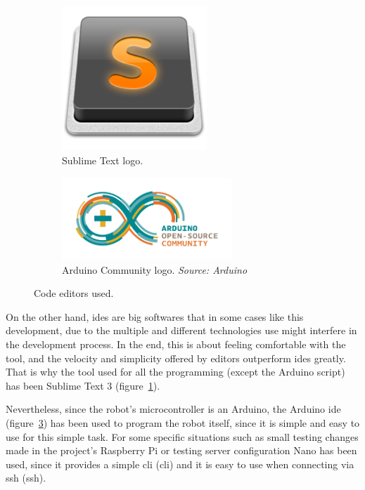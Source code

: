 \begin{figure}[!htbp]
	\centering
	\begin{subfigure}{0.35\textwidth}
		\centering
		\includegraphics[width=0.6\textwidth]{fig/sublime}
		\caption{Sublime Text logo.}\label{subfig:sublime}
	\end{subfigure}\quad
	\begin{subfigure}{0.55\textwidth}
		\centering
		\includegraphics[width=0.7\textwidth]{fig/arduino-community}
		\caption{Arduino Community logo. \emph{Source: Arduino}}\label{subfig:arduino_community}
	\end{subfigure}\quad
	\caption{Code editors used.}
\end{figure}

On the other hand, \acrshort{ide}s are big softwares that in some cases like this development, due
to the multiple and different technologies use might interfere in the development process. In the
end, this is about feeling comfortable with the tool, and the velocity and simplicity offered by
editors outperform \acrshort{ide}s greatly. That is why the tool used for all the programming
(except the Arduino script) has been Sublime Text 3 (figure~\ref{subfig:sublime}).

Nevertheless, since the robot's microcontroller is an Arduino, the Arduino
\acrshort{ide}~\cite{arduino_ide} (figure~\ref{subfig:arduino_community}) has been used to program
the robot itself, since it is simple and easy to use for this simple task. For some specific
situations such as small testing changes made in the project's Raspberry Pi or testing server
configuration Nano has been used, since it provides a simple \acrshort{cli} (\acrlong{cli}) and it
is easy to use when connecting via \acrshort{ssh} (\acrlong{ssh}).

